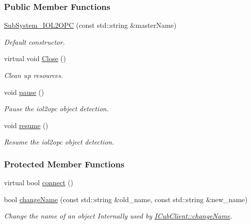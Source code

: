 \subsubsection*{Public Member Functions}
\begin{DoxyCompactItemize}
\item 
\hyperlink{group__icubclient__subsystems_ae59e5eea9897cea515d5b28a2ad57734}{Sub\+System\+\_\+\+I\+O\+L2\+O\+PC} (const std\+::string \&master\+Name)
\begin{DoxyCompactList}\small\item\em Default constructor. \end{DoxyCompactList}\item 
virtual void \hyperlink{group__icubclient__subsystems_a15246d09894da753d1672f58b6af8556}{Close} ()
\begin{DoxyCompactList}\small\item\em Clean up resources. \end{DoxyCompactList}\item 
void \hyperlink{group__icubclient__subsystems_a09c98f6a86748aa507fdb0d28ee1309a}{pause} ()
\begin{DoxyCompactList}\small\item\em Pause the iol2opc object detection. \end{DoxyCompactList}\item 
void \hyperlink{group__icubclient__subsystems_a6633b7fcf67e9d7153f8060aab3d9a98}{resume} ()
\begin{DoxyCompactList}\small\item\em Resume the iol2opc object detection. \end{DoxyCompactList}\end{DoxyCompactItemize}
\subsubsection*{Protected Member Functions}
\begin{DoxyCompactItemize}
\item 
virtual bool \hyperlink{group__icubclient__subsystems_a1407547931468f9d704e10e3436ed467}{connect} ()
\item 
bool \hyperlink{group__icubclient__subsystems_a08ccd01433080f2dce96aea13cf6c898}{change\+Name} (const std\+::string \&old\+\_\+name, const std\+::string \&new\+\_\+name)
\begin{DoxyCompactList}\small\item\em Change the name of an object Internally used by \hyperlink{group__icubclient__clients_a860fb1399bafb125c3955110dc17a42e}{I\+Cub\+Client\+::change\+Name}. \end{DoxyCompactList}\end{DoxyCompactItemize}
